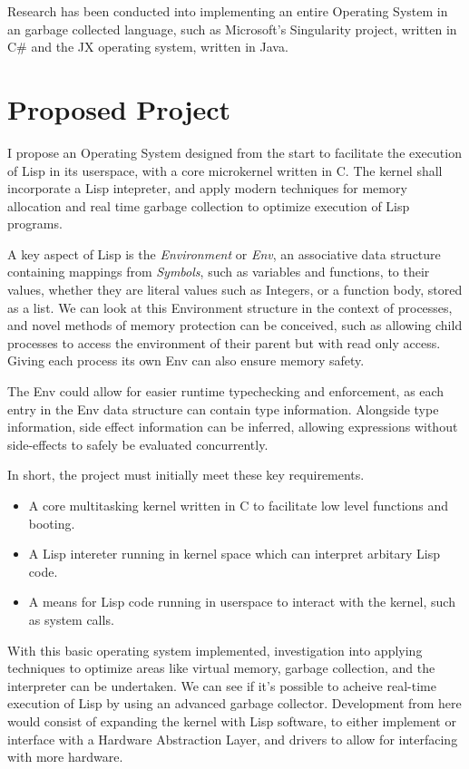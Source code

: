 \documentclass{article}
\begin{document}
  Research has been conducted into implementing an entire Operating System in an garbage collected language, such as Microsoft's Singularity project, written in C\#\cite{hunt2007singularity} and the JX operating system, written in Java\cite{Golm:2002:JOS:647057.713870}.

  
  \section{Proposed Project}
  I propose an Operating System designed from the start to facilitate the execution of Lisp in its userspace, with a core microkernel written in C. The kernel shall incorporate a Lisp intepreter, and apply modern techniques for memory allocation and real time garbage collection to optimize execution of Lisp programs.
  \par
  A key aspect of Lisp is the \textit{Environment} or \textit{Env}, an associative data structure containing mappings from \textit{Symbols}, such as variables and functions, to their values, whether they are literal values such as Integers, or a function body, stored as a list. We can look at this Environment structure in the context of processes, and novel methods of memory protection can be conceived, such as allowing child processes to access the environment of their parent but with read only access. Giving each process its own Env can also ensure memory safety.
  \par
  The Env could allow for easier runtime typechecking and enforcement, as each entry in the Env data structure can contain type information. Alongside type information, side effect information can be inferred, allowing expressions without side-effects to safely be evaluated concurrently.
  \par

  In short, the project must initially meet these key requirements.
  \begin{itemize}
  \item A core multitasking kernel written in C to facilitate low level functions and booting.
  \item A Lisp intereter running in kernel space which can interpret arbitary Lisp code.
  \item A means for Lisp code running in userspace to interact with the kernel, such as system calls.
  \end{itemize}

  With this basic operating system implemented, investigation into applying techniques to optimize areas like virtual memory, garbage collection, and the interpreter can be undertaken. We can see if it's possible to acheive real-time execution of Lisp by using an advanced garbage collector. Development from here would consist of expanding the kernel with Lisp software, to either implement or interface with a Hardware Abstraction Layer, and drivers to allow for interfacing with more hardware.
\end{document}
